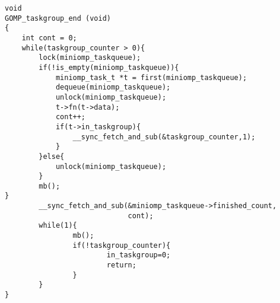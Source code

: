 \begin{lstlisting}[caption=Taskgroup end implementation,label=tgend]
void
GOMP_taskgroup_end (void)
{
    int cont = 0;
    while(taskgroup_counter > 0){
        lock(miniomp_taskqueue);
        if(!is_empty(miniomp_taskqueue)){
            miniomp_task_t *t = first(miniomp_taskqueue);
            dequeue(miniomp_taskqueue);
            unlock(miniomp_taskqueue);
            t->fn(t->data);
            cont++;
            if(t->in_taskgroup){
                __sync_fetch_and_sub(&taskgroup_counter,1);
            }
        }else{
            unlock(miniomp_taskqueue);
        }
        mb();
}
        __sync_fetch_and_sub(&miniomp_taskqueue->finished_count,
                             cont);
        while(1){
                mb();
                if(!taskgroup_counter){
                        in_taskgroup=0;
                        return; 
                }
        }
}
\end{lstlisting}


